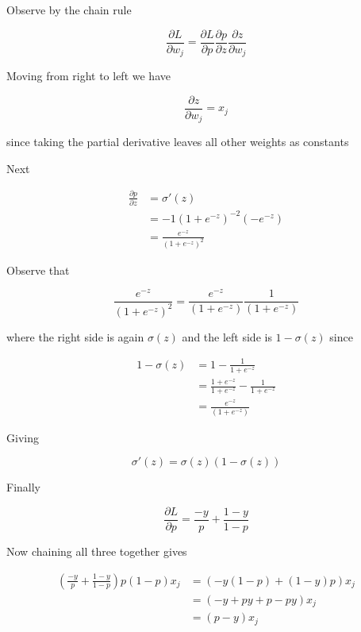 \documentclass{article}
\theoremstyle{remark}
\begin{document}
Observe by the chain rule 

\begin{equation*}
\frac{\partial L}{\partial w_j} = 
\frac{\partial L}{\partial p}\frac{\partial p}{\partial z}\frac{\partial z}{\partial w_j}
\end{equation*}

Moving from right to left we have 

\begin{equation*}
\frac{\partial z}{\partial w_j} = x_j
\end{equation*}

since taking the partial derivative leaves all other weights as constants

Next 

\begin{align*}
\frac{\partial p}{\partial z}
  &= \sigma'(z) \\
  &= -1(1 + e^{-z})^{-2}(-e^{-z}) \\
  &= \frac{e^{-z}}{(1 + e^{-z})^2} 
\end{align*}
  
Observe that 

\begin{equation*}
\frac{e^{-z}}{(1 + e^{-z})^2} = \frac{e^{-z}}{(1 + e^{-z})}\frac{1}{{(1 + e^{-z})}}
\end{equation*}

where the right side is again
$\sigma(z)$ and the left side is $1 - \sigma(z)$ since 

\begin{align*}
1 - \sigma(z)
  &= 1 - \frac{1}{1 + e^{-z}} \\
  &= \frac{1 + e^{-z}}{1 + e^{-z}} - \frac{1}{1 + e^{-z}} \\
  &= \frac{e^{-z}}{(1 + e^{-z})} 
\end{align*}
  
Giving 

\begin{equation*}
\sigma'(z) = \sigma(z)(1-\sigma(z))
\end{equation*}

Finally 

\begin{equation*}
\frac{\partial L}{\partial p} = \frac{-y}{p} + \frac{1 - y}{1 - p}
\end{equation*}

Now chaining all three together gives 

\begin{align*}
\left(\frac{-y}{p} + \frac{1 - y}{1 - p}\right)p(1-p)x_j
  &= (-y(1-p) + (1-y)p)x_j \\
  &= (-y + py + p -py)x_j \\
  &= (p - y)x_j
\end{align*}
\end{document}

